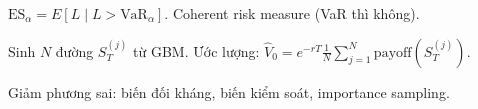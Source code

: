 \documentclass[12pt,a4paper]{article}
\begin{document}
\begin{dinhnghia}[title={Expected Shortfall (CVaR)}]
  $\text{ES}_\alpha = E[L \mid L > \text{VaR}_\alpha]$. Coherent risk measure (VaR thì không).
\end{dinhnghia}

\begin{phuongphap}[title={Mô phỏng Monte Carlo}]
  Sinh $N$ đường $S_T^{(j)}$ từ GBM. Ước lượng: $\hat{V}_0 = e^{-rT}\frac{1}{N}\sum_{j=1}^{N}\text{payoff}(S_T^{(j)})$.

  Giảm phương sai: biến đối kháng, biến kiểm soát, importance sampling.
\end{phuongphap}
\end{document}
